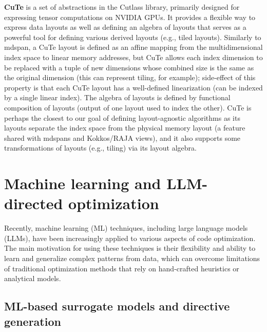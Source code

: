 \textbf{CuTe} is a set of \cpp abstractions in the Cutlass library, primarily designed for expressing tensor computations on NVIDIA GPUs\@. It provides a flexible way to express data layouts as well as defining an algebra of layouts that serves as a powerful tool for defining various derived layouts (e.g., tiled layouts). Similarly to mdspan, a CuTe layout is defined as an affine mapping from the multidimensional index space to linear memory addresses, but CuTe allows each index dimension to be replaced with a tuple of new dimensions whose combined size is the same as the original dimension (this can represent tiling, for example); side-effect of this property is that each CuTe layout has a well-defined linearization (can be indexed by a single linear index). The algebra of layouts is defined by functional composition of layouts (output of one layout used to index the other). CuTe is perhaps the closest to our goal of defining layout-agnostic algorithms as its layouts separate the index space from the physical memory layout (a feature shared with mdspans and Kokkos/RAJA views), and it also supports some transformations of layouts (e.g., tiling) via its layout algebra.


\section{Machine learning and LLM-directed optimization}\label{sec:ml-directed-optimization}

Recently, machine learning (ML) techniques, including large language models (LLMs), have been increasingly applied to various aspects of code optimization. The main motivation for using these techniques is their flexibility and ability to learn and generalize complex patterns from data, which can overcome limitations of traditional optimization methods that rely on hand-crafted heuristics or analytical models.


\subsection{ML-based surrogate models and directive generation}\label{sec:ml-surrogate-models}

